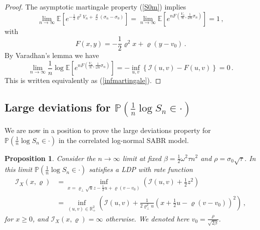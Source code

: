 \documentclass[11pt]{article}
\numberwithin{equation}{section}
\theoremstyle{plain}
\newtheorem{proposition}[theorem]{Proposition}
\begin{document}
\begin{proof}
The asymptotic martingale property (\ref{S0m}) implies
\begin{equation}
\lim_{n\rightarrow\infty}\mathbb{E}\left[e^{- \frac12 \varrho^2 V_n + \frac{\varrho}{\omega} 
(\sigma_n-\sigma_0)}\right]
= \lim_{n\rightarrow\infty}\mathbb{E}\left[e^{nF(\frac{V_n}{n}, \frac{1}{\omega n} \sigma_n)}\right] = 1\,,
\end{equation}
with 
\begin{equation}
F(x,y) = - \frac12 \varrho^2 x + \varrho (y - v_0)\,.
\end{equation}
By Varadhan's lemma we have
\begin{equation}
\lim_{n\to \infty} \frac{1}{n} \log \mathbb{E}\left[e^{nF(\frac{V_n}{n}, \frac{1}{\omega n} \sigma_n)}\right]
= -\inf_{u,v} \left\{ \mathcal{I}(u,v) - F(u,v) \right\} = 0\,.
\end{equation}
This is written equivalently as (\ref{infmartingale}).


\end{proof}

\subsection{Large deviations for $\mathbb{P}(\frac{1}{n} \log S_n \in \cdot )$}


We are now in a position to prove the large deviations property for 
$\mathbb{P}(\frac{1}{n} \log S_n\in\cdot)$ in the correlated log-normal 
SABR model.

\begin{proposition}\label{prop:LDlogS}
Consider the $n\to \infty$ limit at fixed $\beta = \frac12 \omega^2 \tau n^2$
and $\rho = \sigma_0 \sqrt{\tau}$.
In this limit $\mathbb{P}(\frac{1}{n} \log S_n \in \cdot )$ satisfies a LDP 
with rate function
\begin{align}\label{I1rf}
\mathcal{I}_X(x,\varrho) &= \inf_{x = \varrho_\perp \sqrt{u} z - \frac12 u + \varrho (v-v_0)}
\left( \mathcal{I}(u,v) + \frac12 z^2 \right) \\
&=
\inf_{(u,v) \in \mathbb{R}_+^2} \left( \mathcal{I}(u,v) + 
\frac{1}{2\varrho_\perp^2 u} \left(x + \frac12 u - \varrho (v-v_0)\right)^2 \right)\,, \nonumber
\end{align}
for $x \geq 0$, and $\mathcal{I}_X(x,\varrho)=\infty$ otherwise.
We denoted here $v_0 = \frac{\rho}{\sqrt{2\beta}}$.
\end{proposition}
\end{document}
